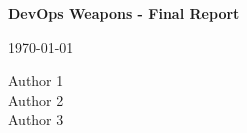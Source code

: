 \begin{titlepage}
    \centering
    
    \vspace*{\fill}
    {\LARGE \textbf{DevOps Weapons - Final Report} \par}
    \vspace{1cm}
    {\large \today \par}
    \vspace{1cm}
    {\large Author 1 \\ Author 2 \\ Author 3 \par}
    \vspace*{\fill}
\end{titlepage} 